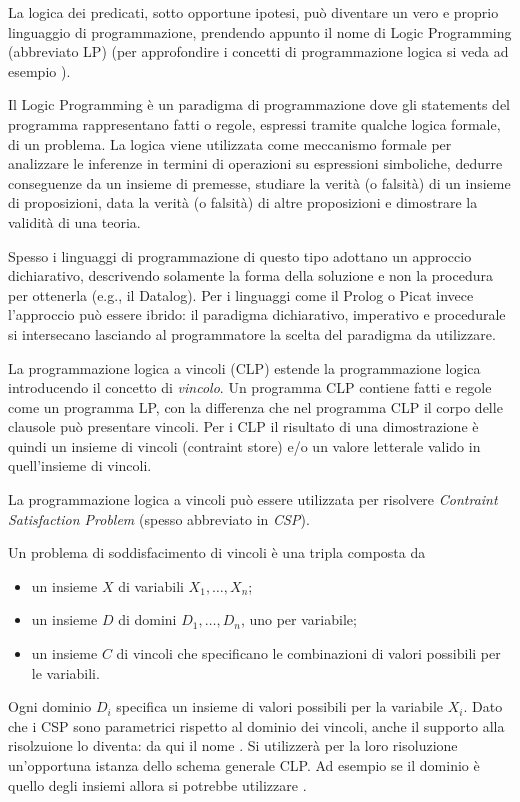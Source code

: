 \documentclass[12pt,a4paper,openright]{book} %
\begin{document}
La logica dei predicati, sotto opportune ipotesi, può diventare un
vero e proprio linguaggio di programmazione, prendendo appunto il nome
di Logic Programming (abbreviato LP) (per approfondire i concetti di
programmazione logica si veda ad esempio \cite{Console97}).

Il Logic Programming è un paradigma di programmazione dove gli
statements del programma rappresentano fatti o regole, espressi
tramite qualche logica formale, di un problema. La logica viene
utilizzata come meccanismo formale per analizzare le inferenze in
termini di operazioni su espressioni simboliche, dedurre conseguenze
da un insieme di premesse, studiare la verità (o falsità) di un
insieme di proposizioni, data la verità (o falsità) di altre
proposizioni e dimostrare la validità di una teoria.

Spesso i linguaggi di programmazione di questo tipo adottano un
approccio dichiarativo, descrivendo solamente la forma della soluzione
e non la procedura per ottenerla (e.g., il Datalog). Per i linguaggi
come il Prolog o Picat invece l'approccio può essere ibrido: il
paradigma dichiarativo, imperativo e procedurale si intersecano
lasciando al programmatore la scelta del paradigma da utilizzare.

La programmazione logica a vincoli (CLP) estende la programmazione
logica introducendo il concetto di \emph{vincolo}. Un programma CLP
contiene fatti e regole come un programma LP, con la differenza che
nel programma CLP il corpo delle clausole può presentare vincoli. Per
i CLP il risultato di una dimostrazione è quindi un insieme di vincoli
(contraint store) e/o un valore letterale valido in quell'insieme di
vincoli.

La programmazione logica a vincoli può essere utilizzata per risolvere
\emph{Contraint Satisfaction Problem} (spesso abbreviato in
\emph{CSP}).

Un problema di soddisfacimento di vincoli è una tripla composta da
\begin{itemize}
	\item un insieme $X$ di variabili ${X_1, \ldots, X_n}$;
	\item un insieme $D$ di domini ${D_1, \ldots, D_n}$, uno per
          variabile;
	\item un insieme $C$ di vincoli che specificano le
          combinazioni di valori possibili per le variabili.
\end{itemize}

Ogni dominio $D_i$ specifica un insieme di valori possibili per la
variabile $X_i$. Dato che i CSP sono parametrici rispetto al dominio
dei vincoli, anche il supporto alla risolzuione lo diventa: da qui il
nome \clpset{}. Si utilizzerà per la loro risoluzione un’opportuna
istanza dello schema generale CLP. Ad esempio se il dominio è quello
degli insiemi allora si potrebbe utilizzare \clpset{}.
\end{document}
